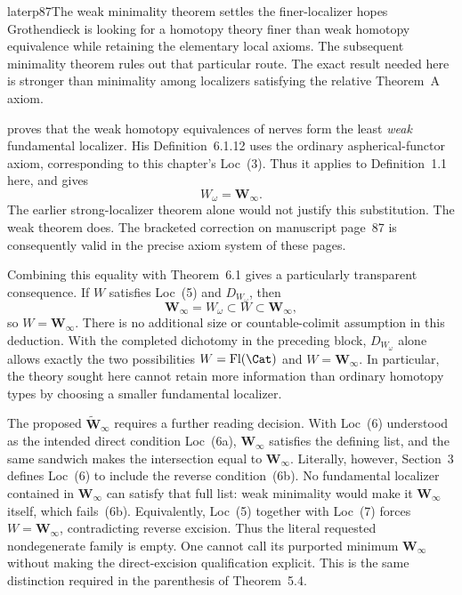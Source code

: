 \begin{dcomment}{later}{p87}{The weak minimality theorem settles the finer-localizer hopes}
Grothendieck is looking for a homotopy theory finer than weak homotopy equivalence while retaining the elementary local axioms. The subsequent minimality theorem rules out that particular route. The exact result needed here is stronger than minimality among localizers satisfying the relative Theorem~A axiom.

\citet[Theorem~6.1.18, pp.~242--243]{Cisinski2006} proves that the weak homotopy equivalences of nerves form the least \emph{weak} fundamental localizer. His Definition~6.1.12 uses the ordinary aspherical-functor axiom, corresponding to this chapter's Loc~(3). Thus it applies to Definition~1.1 here, and gives
\[
 W_\omega=\mathbf W_\infty.
\]
The earlier strong-localizer theorem alone would not justify this substitution. The weak theorem does. The bracketed correction on manuscript page~87 is consequently valid in the precise axiom system of these pages.

Combining this equality with Theorem~6.1 gives a particularly transparent consequence. If $W$ satisfies Loc~(5) and $D_{W_\omega}$, then
\[
 \mathbf W_\infty=W_\omega\subset W\subset\mathbf W_\infty,
\]
so $W=\mathbf W_\infty$. There is no additional size or countable-colimit assumption in this deduction. With the completed dichotomy in the preceding block, $D_{W_\omega}$ alone allows exactly the two possibilities $W=\operatorname{Fl}(\Cat)$ and $W=\mathbf W_\infty$. In particular, the theory sought here cannot retain more information than ordinary homotopy types by choosing a smaller fundamental localizer.

The proposed $\widetilde{\mathbf W}_\infty$ requires a further reading decision. With Loc~(6) understood as the intended direct condition Loc~(6a), $\mathbf W_\infty$ satisfies the defining list, and the same sandwich makes the intersection equal to $\mathbf W_\infty$. Literally, however, Section~3 defines Loc~(6) to include the reverse condition~(6b). No fundamental localizer contained in $\mathbf W_\infty$ can satisfy that full list: weak minimality would make it $\mathbf W_\infty$ itself, which fails~(6b). Equivalently, Loc~(5) together with Loc~(7) forces $W=\mathbf W_\infty$, contradicting reverse excision. Thus the literal requested nondegenerate family is empty. One cannot call its purported minimum $\mathbf W_\infty$ without making the direct-excision qualification explicit. This is the same distinction required in the parenthesis of Theorem~5.4.


\end{dcomment}
